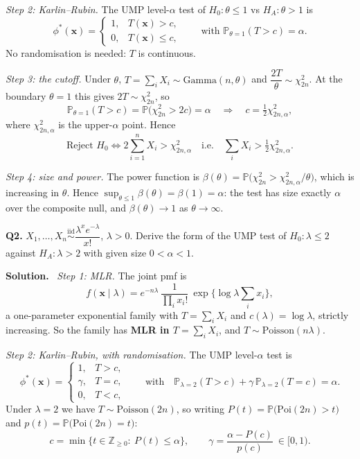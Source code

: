 \documentclass[11pt]{article}
\newcommand{\Prob}{\mathbb{P}}
\newcommand{\iid}{\overset{\text{iid}}{\sim}}
\newenvironment{prob}[1]{\medskip\noindent\textbf{\large #1}\quad}{\par}
\newcommand{\soln}{\medskip\noindent\textbf{Solution.}\ }
\begin{document}
\emph{Step 2: Karlin--Rubin.} The UMP level-$\alpha$ test of $H_0:\theta\le1$ vs
$H_A:\theta>1$ is
\[
\phi^*(\mathbf{x})=\begin{cases}1,& T(\mathbf{x})>c,\\ 0,& T(\mathbf{x})\le c,\end{cases}
\qquad\text{with } \Prob_{\theta=1}(T>c)=\alpha .
\]
No randomisation is needed: $T$ is continuous.

\emph{Step 3: the cutoff.} Under $\theta$, $T=\sum_iX_i\sim\mathrm{Gamma}(n,\theta)$ and
$\dfrac{2T}{\theta}\sim\chi^2_{2n}$. At the boundary $\theta=1$ this gives $2T\sim\chi^2_{2n}$,
so
\[
\Prob_{\theta=1}(T>c)=\Prob\big(\chi^2_{2n}>2c\big)=\alpha
\quad\Longrightarrow\quad c=\tfrac12\chi^2_{2n,\alpha},
\]
where $\chi^2_{2n,\alpha}$ is the upper-$\alpha$ point. Hence
\[
\boxed{\ \text{Reject } H_0 \iff 2\sum_{i=1}^nX_i>\chi^2_{2n,\alpha}
\quad\text{i.e.}\quad \sum_i X_i>\tfrac12\chi^2_{2n,\alpha}.\ }
\]

\emph{Step 4: size and power.} The power function is
$\beta(\theta)=\Prob\big(\chi^2_{2n}>\chi^2_{2n,\alpha}/\theta\big)$, which is increasing in
$\theta$. Hence $\sup_{\theta\le1}\beta(\theta)=\beta(1)=\alpha$: the test has size exactly
$\alpha$ over the composite null, and $\beta(\theta)\to1$ as $\theta\to\infty$.

\bigskip
\begin{prob}{Q2.}
$X_1,\dots,X_n\iid \dfrac{\lambda^x e^{-\lambda}}{x!}$, $\lambda>0$. Derive the form of the UMP
test of $H_0:\lambda\le2$ against $H_A:\lambda>2$ with given size $0<\alpha<1$.
\end{prob}

\soln
\emph{Step 1: MLR.} The joint pmf is
\[
f(\mathbf{x}\mid\lambda)=e^{-n\lambda}\ \frac{1}{\prod_i x_i!}\ \exp\Big\{\log\lambda\sum_i x_i\Big\},
\]
a one-parameter exponential family with $T=\sum_iX_i$ and $c(\lambda)=\log\lambda$, strictly
increasing. So the family has \textbf{MLR in $T=\sum_iX_i$}, and $T\sim\mathrm{Poisson}(n\lambda)$.

\emph{Step 2: Karlin--Rubin, with randomisation.} The UMP level-$\alpha$ test is
\[
\phi^*(\mathbf{x})=
\begin{cases}
1,&T>c,\\[2pt]
\gamma,&T=c,\\[2pt]
0,&T<c,
\end{cases}
\qquad\text{with}\quad
\Prob_{\lambda=2}(T>c)+\gamma\,\Prob_{\lambda=2}(T=c)=\alpha .
\]
Under $\lambda=2$ we have $T\sim\mathrm{Poisson}(2n)$, so writing
$P(t)=\Prob\big(\mathrm{Poi}(2n)>t\big)$ and $p(t)=\Prob\big(\mathrm{Poi}(2n)=t\big)$:
\[
\boxed{\ c=\min\{t\in\mathbb{Z}_{\ge0}:\ P(t)\le\alpha\},\qquad
\gamma=\frac{\alpha-P(c)}{p(c)}\ \in[0,1).\ }
\]
\end{document}

